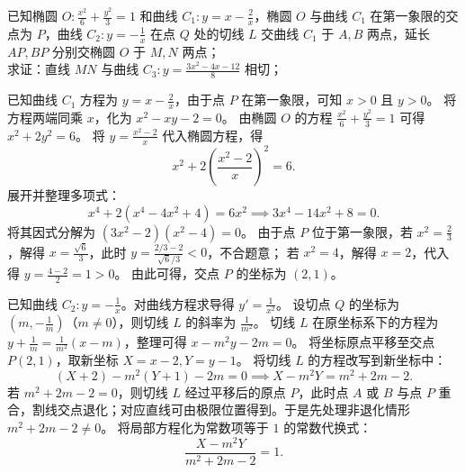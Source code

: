 \begin{example}
已知椭圆 $O: \frac{x^2}{6} + \frac{y^2}{3} = 1$ 和曲线 $C_1: y = x - \frac{2}{x}$，椭圆 $O$ 与曲线 $C_1$ 在第一象限的交点为 $P$，曲线 $C_2: y = -\frac{1}{x}$ 在点 $Q$ 处的切线 $L$ 交曲线 $C_1$ 于 $A,B$ 两点，延长 $AP,BP$ 分别交椭圆 $O$ 于 $M,N$ 两点；\\
求证：直线 $MN$ 与曲线 $C_3: y = \frac{3x^2 - 4x - 12}{8}$ 相切；
\end{example}
\begin{solution}
已知曲线 $C_1$ 方程为 $y = x - \frac{2}{x}$，由于点 $P$ 在第一象限，可知 $x > 0$ 且 $y > 0$。
将方程两端同乘 $x$，化为 $x^2 - xy - 2 = 0$。
由椭圆 $O$ 的方程 $\frac{x^2}{6} + \frac{y^2}{3} = 1$ 可得 $x^2 + 2y^2 = 6$。
将 $y = \frac{x^2 - 2}{x}$ 代入椭圆方程，得
\[ x^2 + 2\left(\frac{x^2 - 2}{x}\right)^2 = 6. \]
展开并整理多项式：
\[ x^4 + 2(x^4 - 4x^2 + 4) = 6x^2 \implies 3x^4 - 14x^2 + 8 = 0. \]
将其因式分解为 $(3x^2 - 2)(x^2 - 4) = 0$。
由于点 $P$ 位于第一象限，若 $x^2 = \frac{2}{3}$，解得 $x = \frac{\sqrt{6}}{3}$，此时 $y = \frac{2/3 - 2}{\sqrt{6}/3} < 0$，不合题意；
若 $x^2 = 4$，解得 $x = 2$，代入得 $y = \frac{4 - 2}{2} = 1 > 0$。
由此可得，交点 $P$ 的坐标为 $(2, 1)$。

已知曲线 $C_2: y = -\frac{1}{x}$。对曲线方程求导得 $y' = \frac{1}{x^2}$。
设切点 $Q$ 的坐标为 $\left(m, -\frac{1}{m}\right)$（$m \neq 0$），则切线 $L$ 的斜率为 $\frac{1}{m^2}$。
切线 $L$ 在原坐标系下的方程为 $y + \frac{1}{m} = \frac{1}{m^2}(x - m)$，整理可得 $x - m^2y - 2m = 0$。
将坐标原点平移至交点 $P(2,1)$，取新坐标 $X = x - 2, Y = y - 1$。
将切线 $L$ 的方程改写到新坐标中：
\[ (X + 2) - m^2(Y + 1) - 2m = 0 \implies X - m^2Y = m^2 + 2m - 2. \]
若 $m^2 + 2m - 2 = 0$，则切线 $L$ 经过平移后的原点 $P$，此时点 $A$ 或 $B$ 与点 $P$ 重合，割线交点退化；对应直线可由极限位置得到。于是先处理非退化情形 $m^2 + 2m - 2 \neq 0$。
将局部方程化为常数项等于 $1$ 的常数代换式：
\[ \frac{X - m^2Y}{m^2 + 2m - 2} = 1. \]


\end{solution}
